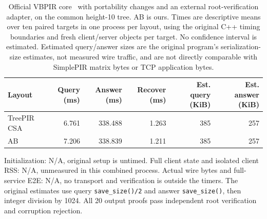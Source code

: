 \begin{table}[t]
\centering\small
\caption{Official VBPIR core~\cite{vectorbatchpir} with portability changes and an external root-verification adapter, on the common height-10 tree. AB is ours. Times are descriptive means over ten paired targets in one process per layout, using the original C++ timing boundaries and fresh client/server objects per target. No confidence interval is estimated. Estimated query/answer sizes are the original program's serialization-size estimates, not measured wire traffic, and are not directly comparable with SimplePIR matrix bytes or TCP application bytes.}
\label{tab:official-vbpir-components}
\setlength{\tabcolsep}{8pt}
\begin{tabular}{lrrrrr}
\toprule
Layout & Query (ms) & Answer (ms) & Recover (ms) & Est. query (KiB) & Est. answer (KiB)\\
\midrule
TreePIR CSA~\cite{treepir} & 6.761 & 338.488 & 1.263 & 385 & 257\\
AB & 7.206 & 338.839 & 1.211 & 385 & 257\\
\bottomrule
\end{tabular}
\par\smallskip
\begin{minipage}{.97\textwidth}\small
Initialization: N/A, original setup is untimed. Full client state and isolated client RSS: N/A, unmeasured in this combined process. Actual wire bytes and full-service E2E: N/A, no transport and verification is outside the timers. The original estimates use query \texttt{save\_size()/2} and answer \texttt{save\_size()}, then integer division by 1024. All 20 output proofs pass independent root verification and corruption rejection.
\end{minipage}
\end{table}
